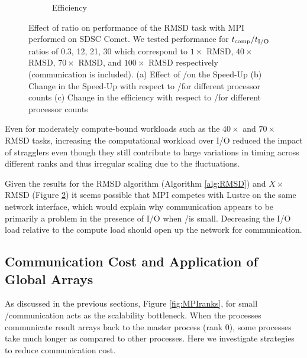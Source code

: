 \begin{figure}[ht!]
\begin{subfigure}{.3\textwidth}
  \caption{Efficiency}
  \label{fig:E_tcomp_tIO_effect}
\end{subfigure}
%
\caption{Effect of \text{$\tcomp/\tIO$} ratio on performance of the RMSD task with MPI performed on SDSC Comet. We tested performance for $\tcomp/\tIO$ ratios of 0.3, 12, 21, 30
which correspond to $1\times$ RMSD, $40\times$ RMSD, $70\times$ RMSD, and $100\times$ RMSD respectively (communication is included). (a) Effect of \tcomp/\tIO on the Speed-Up
(b) Change in the Speed-Up with respect to \tcomp/\tIO for different processor counts (c) Change in the efficiency with respect to \tcomp/\tIO for different processor counts}
\label{fig:tcomp_tIO_effect}
\end{figure}

Even for moderately compute-bound workloads such
as the $40\times$ and $70\times$ RMSD tasks, increasing the computational workload over I/O reduced the impact of stragglers even
though they still contribute to large variations in timing across different ranks and thus irregular scaling due to the fluctuations.

Given the results for the RMSD algorithm (Algorithm \ref{alg:RMSD}) and $X\times$ RMSD (Figure \ref{fig:tcomp_tIO_effect})
it seems possible that MPI competes with Lustre on the same network interface, which would explain why communication appears to
be primarily a problem in the presence of I/O when \tcomp/\tIO is small.
Decreasing the I/O load relative to the compute load should open up the network for communication. 

\subsection{Communication Cost and Application of Global Arrays}
\label{Global-Array}
As discussed in the previous sections, Figure \ref{fig:MPIranks}, for small \tcomp/\tIO communication acts as the scalability bottleneck. 
When the processes communicate result arrays back to the master process (rank 0), some processes take much longer as compared to other processes. 
Here we investigate strategies to reduce communication cost. 


